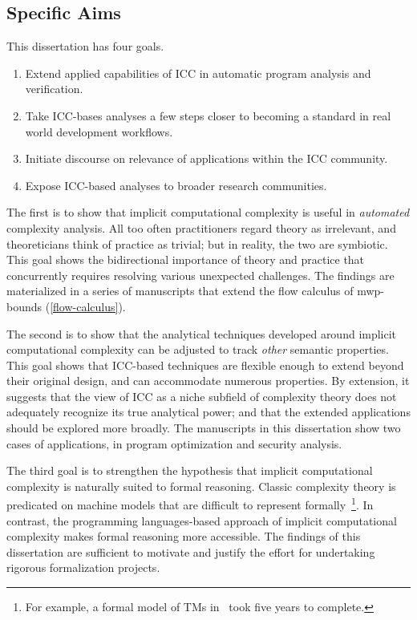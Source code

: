 \subsection{Specific Aims}\label{subsec:specific-aims}

This dissertation has four goals.

\begin{enumerate}
\item Extend {applied} capabilities of ICC in automatic program analysis and verification.
\item Take ICC-bases analyses a few steps closer to becoming a standard in real world development workflows.
\item Initiate discourse on relevance of applications within the ICC community.
\item Expose ICC-based analyses to broader research communities.
\end{enumerate}

The first is to show that implicit computational complexity is useful in \emph{automated} complexity analysis.
All too often practitioners regard theory as irrelevant, and theoreticians think of practice as trivial;
but in reality, the two are symbiotic.
This goal shows the bidirectional importance of theory and practice that concurrently requires resolving various unexpected challenges. 
The findings are materialized in a series of manuscripts that extend the flow calculus of mwp-bounds (\autoref{flow-calculus}).

The second is to show that the analytical techniques developed around implicit computational complexity can be adjusted to track \emph{other} semantic properties.
This goal shows that ICC-based techniques are flexible enough to extend beyond their original design, and can accommodate numerous properties.
By extension, it suggests that the view of ICC as a niche subfield of complexity theory does not adequately recognize its true analytical power;
and that the extended applications should be explored more broadly.
The manuscripts in this dissertation show two cases of applications, in program optimization and security analysis.
 
The third goal is to strengthen the hypothesis that implicit computational complexity is naturally suited to formal reasoning.
Classic complexity theory is predicated on machine models that are difficult to represent formally~\footnote{
For example, a formal model of TMs in~\textcite{forster2020} took five years to complete.}.
In contrast, the programming languages-based approach of implicit computational complexity makes formal reasoning more accessible.
The findings of this dissertation are sufficient to motivate and justify the effort for undertaking rigorous formalization projects.

